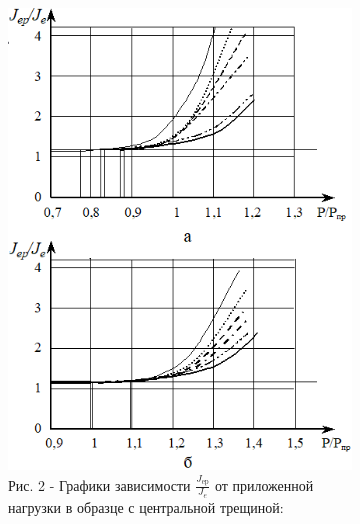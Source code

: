 \begin{figure}[H]
    \centering
    \begin{subfigure}[b]{0.45\textwidth}
        \centering
        \includegraphics[width=\textwidth]{assets/1148}
		\caption*{Рис. 2 - Графики зависимости $\frac{J_{\text{ep}}}{J_{e}}$ от приложенной нагрузки в образце с центральной трещиной:}
    \end{subfigure}
    \hfill
    \begin{subfigure}[b]{0.45\textwidth}
        \centering

\end{subfigure}
\end{figure}
